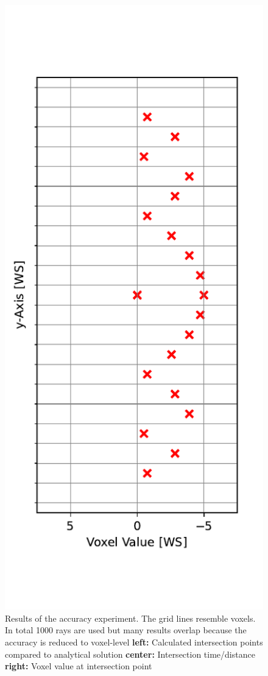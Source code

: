 \begin{figure}[h]
	  \includegraphics[width=\linewidth]{res/intersection_values.pdf}
	\endminipage
		\caption{ Results of the accuracy experiment. The grid lines resemble voxels. In total 1000 rays are used but many results overlap because the accuracy is reduced to voxel-level
        \textbf{left:} Calculated intersection points compared to analytical solution
		    \textbf{center:} Intersection time/distance
        \textbf{right:} Voxel value at intersection point
        }
	\label{fig:results_accuracy}
\end{figure}





\nocite{openvdb}
\nocite{nanovdb}
